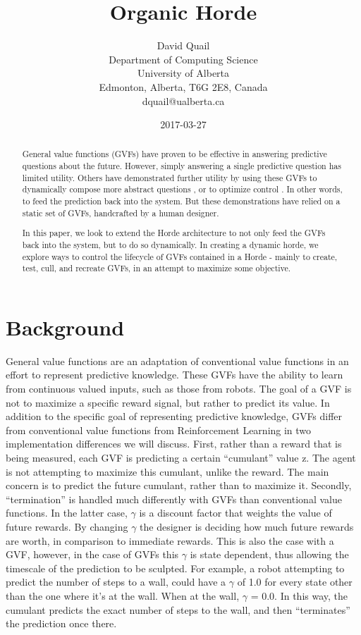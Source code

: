 \documentclass[letterpaper]{article}
\title{Organic Horde}
\date{2017-03-27}
\author{David Quail\\
Department of Computing Science \\ University of Alberta \\
Edmonton, Alberta, T6G 2E8, Canada \\
dquail@ualberta.ca}
\begin{document}
\maketitle
\begin{abstract}
General value functions (GVFs) have proven to be effective in answering predictive questions about the future. However, simply answering a single predictive question has limited utility. Others have demonstrated further utility by using these GVFs to dynamically compose more abstract questions \cite{representingknowledge}, or to optimize control \cite{modayil2014prediction}. In other words, to feed the prediction back into the system. But these demonstrations have relied on a static set of GVFs, handcrafted by a human designer.

In this paper, we look to extend the Horde architecture \cite{sutton2011horde} to not only feed the GVFs back into the system, but to do so dynamically. In creating a dynamic horde, we explore ways to control the lifecycle of GVFs contained in a Horde - mainly to create, test, cull, and recreate GVFs, in an attempt to maximize some objective.
\end{abstract}
    
\section{Background}

General value functions are an adaptation of conventional value functions in an effort to represent predictive knowledge. These GVFs have the ability to learn from continuous valued inputs, such as those from robots. The goal of a GVF is not to maximize a specific reward signal, but rather to predict its value. In addition to the specific goal of representing predictive knowledge, GVFs differ from conventional value functions from Reinforcement Learning in two implementation differences we will discuss.
First, rather than a reward that is being measured, each GVF is predicting a certain ``cumulant'' value z. The agent is not attempting to maximize this cumulant, unlike the reward. The main concern is to predict the future cumulant, rather than to maximize it. Secondly, ``termination'' is handled much differently with GVFs than conventional value functions. In the latter case, $\gamma$ is a discount factor that weights the value of future rewards. By changing $\gamma$ the designer is deciding how much future rewards are worth, in comparison to immediate rewards. This is also the case with a GVF, however, in the case of GVFs this $\gamma$ is state dependent, thus allowing the timescale of the prediction to be sculpted. For example, a robot attempting to predict the number of steps to a wall, could have a $\gamma$ of 1.0 for every state other than the one where it's at the wall. When at the wall, $\gamma$ = 0.0. In this way, the cumulant predicts the exact number of steps to the wall, and then ``terminates'' the prediction once there.
\end{document}
